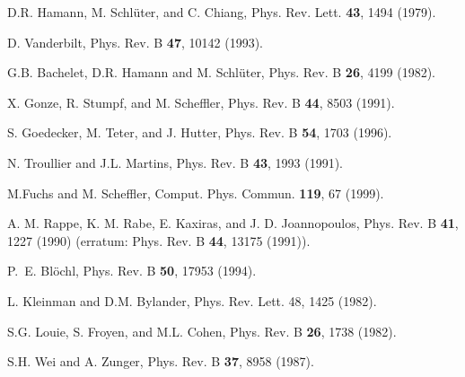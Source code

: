 \begin{thebibliography}{10}

D.R. Hamann, M. Schl\"uter, and C. Chiang, 
Phys. Rev. Lett. {\bf 43}, 1494 (1979).

 D. Vanderbilt, Phys. Rev. B  {\bf 47}, 10142 (1993).

G.B. Bachelet, D.R. Hamann and M. Schl\"uter, Phys. Rev. B {\bf 26},
4199 (1982). 

X. Gonze, R. Stumpf, and M. Scheffler, Phys. Rev. B {\bf 44}, 8503 (1991).

S. Goedecker, M. Teter, and J. Hutter, Phys. Rev. B {\bf 54}, 1703 (1996).

 N. Troullier and J.L. Martins, Phys. Rev. B {\bf 43},
1993 (1991).

M.Fuchs and M. Scheffler, Comput. Phys. Commun. {\bf 119}, 67 (1999).

 A. M. Rappe, K. M. Rabe, E. Kaxiras, and J. D. Joannopoulos, 
Phys. Rev. B {\bf 41}, 1227 (1990) 
(erratum: Phys. Rev. B {\bf 44}, 13175 (1991)).

 P.~E. Bl\"ochl, Phys. Rev. B {\bf 50}, 17953 (1994).

 L. Kleinman and D.M. Bylander, Phys. Rev. Lett. 48, 1425 (1982).

S.G. Louie, S. Froyen, and M.L. Cohen, Phys. Rev. B {\bf 26}, 1738 (1982).

 S.H. Wei and A. Zunger, Phys. Rev. B {\bf 37}, 8958 (1987).

\end{thebibliography}


